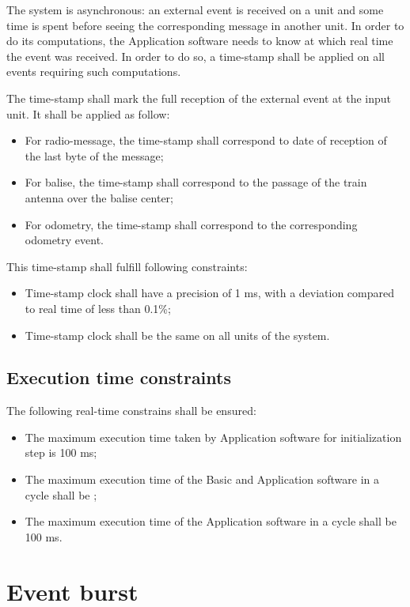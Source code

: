 The system is asynchronous: an external event is received on a unit and some
time is spent before seeing the corresponding message in another
unit. In order to do its computations, the Application software needs
to know at which real time the event was received. In order to do so,
a time-stamp shall be applied on all events requiring such
computations. 

The time-stamp shall mark the full reception of the external event at
the input unit. It shall be applied as follow:
\begin{itemize}
\item For radio-message, the time-stamp shall correspond to date of
  reception of the last byte of the message;
\item For balise, the time-stamp shall correspond to the passage of
  the train antenna over the balise center;
\item For odometry, the time-stamp shall correspond to the
  corresponding odometry event.
\end{itemize}

This time-stamp shall fulfill
following constraints:
\begin{itemize}
\item Time-stamp clock shall have a precision of 1 ms, with a
  deviation compared to real time of less than 0.1\%;
\item Time-stamp clock shall be the same on all units of the system.
\end{itemize}

\subsection{Execution time constraints}

The following real-time constrains shall be ensured:
\begin{itemize}
\item The maximum execution time taken by Application software for
  initialization step is 100 ms;
\item The maximum execution time of the Basic and Application software
  in a cycle shall be ;
\item The maximum execution time of the Application software in a
  cycle shall be 100 ms.
\end{itemize}

\section{Event burst}


